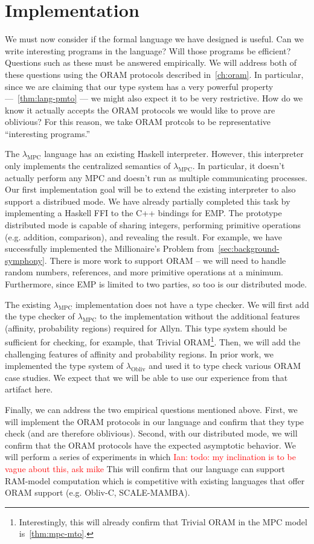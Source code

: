 \documentclass{report}
\newcommand{\lang}{Allyn\xspace}
\newcommand{\mpc}{\ensuremath{\lambda_{\mathrm{MPC}}}\xspace}
\newcommand{\obliv}{\ensuremath{\lambda_{\mathrm{Obliv}}}\xspace}
\newcommand{\ins}[1]{\textcolor{red}{Ian: #1}}
\begin{document}
\section{Implementation}

We must now consider if the formal language we have designed is useful. Can we write interesting programs in the language?
Will those programs be efficient? Questions such as these must be answered empirically. We will address both of these questions
using the ORAM protocols described in~\cref{ch:oram}. In particular, since we are claiming that our type system has a very powerful
property ---~\cref{thm:lang-pmto} --- we might also expect it to be very restrictive. How do we know it actually accepts the ORAM
protocols we would like to prove are oblivious? For this reason, we take ORAM protcols to be representative ``interesting programs.''

The \mpc language has an existing Haskell interpreter. However, this interpreter only implements the centralized semantics of \mpc.
In particular, it doesn't actually perform any MPC and doesn't run as multiple communicating processes. Our first implementation
goal will be to extend the existing interpreter to also support a distribued mode. We have already partially completed this task
by implementing a Haskell FFI to the C++ bindings for EMP. The prototype distributed mode is capable of sharing integers, performing
primitive operations (e.g. addition, comparison), and revealing the result. For example, we have successfully implemented the Millionaire's Problem
from~\ref{sec:background-symphony}. There is more work to support ORAM -- we will need to handle random numbers, references, and
more primitive operations at a minimum. Furthermore, since EMP is limited to two parties, so too is our distributed mode.

The existing \mpc implementation does not have a type checker. We will first add the type checker of \mpc to the implementation without
the additional features (affinity, probability regions) required for \lang. This type system should be sufficient for checking, for example,
that Trivial ORAM\footnote{Interestingly, this will already confirm that Trivial ORAM in the MPC model is~\ref{thm:mpc-mto}.}. Then, we will
add the challenging features of affinity and probability regions. In prior work, we implemented the type system of \obliv and used it to
type check various ORAM case studies. We expect that we will be able to use our experience from that artifact here.

Finally, we can address the two empirical questions mentioned above. First, we will implement the ORAM protocols in our language and confirm
that they type check (and are therefore oblivious). Second, with our distributed mode, we will confirm that the ORAM protocols have the
expected asymptotic behavior. We will perform a series of experiments in which \ins{todo: my inclination is to be vague about this, ask mike}
This will confirm that our language can support RAM-model computation which is competitive with existing languages that offer ORAM support
(e.g. Obliv-C, SCALE-MAMBA).
\end{document}
